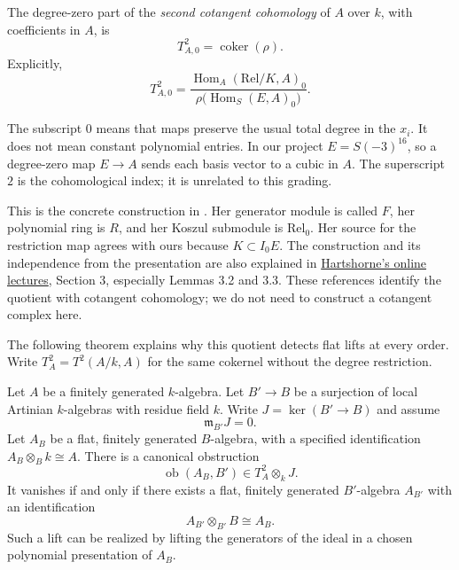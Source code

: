 \begin{definition}
\label{definition-cotangent-two}
The degree-zero part of the
\emph{second cotangent cohomology} of
$A$ over $k$, with coefficients in $A$, is
$$
T^2_{A,0}=\operatorname{coker}(\rho).
$$
Explicitly,
\begin{equation}
\label{equation-cotangent-two-quotient}
T^2_{A,0}=
\frac{
\operatorname{Hom}_A(\mathrm{Rel}/K,A)_0
}{
\rho\bigl(\operatorname{Hom}_S(E,A)_0\bigr)
}.
\end{equation}
\end{definition}

\noindent
The subscript $0$ means that maps preserve
the usual total degree in the $x_i$.
It does not mean constant polynomial
entries. In our project $E=S(-3)^{16}$,
so a degree-zero map $E\to A$ sends each
basis vector to a cubic in $A$.
The superscript $2$ is the cohomological
index; it is unrelated to this grading.

This is the concrete construction in
\cite[Section 0.2]{Fausk}. Her generator
module is called $F$, her polynomial ring
is $R$, and her Koszul submodule is
$\mathrm{Rel}_0$. Her source for the
restriction map agrees with ours because
$K\subset I_0E$.
The construction and its independence
from the presentation are also explained
in \href{https://math.berkeley.edu/%
\string~robin/math274root.pdf}
{Hartshorne's online lectures}, Section 3,
especially Lemmas 3.2 and 3.3.
These references identify the quotient
with cotangent cohomology; we do not need
to construct a cotangent complex here.

The following theorem explains why this
quotient detects flat lifts at every order.
Write $T^2_A=T^2(A/k,A)$ for the same
cokernel without the degree restriction.

\begin{theorem}
\label{theorem-obstruction-flat-lift}
Let $A$ be a finitely generated
$k$-algebra. Let $B'\to B$ be a surjection
of local Artinian $k$-algebras with
residue field $k$. Write $J=\ker(B'\to B)$
and assume
$$
\mathfrak{m}_{B'}J=0.
$$
Let $A_B$ be a flat, finitely generated
$B$-algebra, with a specified
identification $A_B\otimes_B k\cong A$.
There is a canonical obstruction
$$
\operatorname{ob}(A_B,B')
\in T^2_A\otimes_k J.
$$
It vanishes if and only if there exists
a flat, finitely generated $B'$-algebra
$A_{B'}$ with an identification
$$
A_{B'}\otimes_{B'}B\cong A_B.
$$
Such a lift can be realized by lifting
the generators of the ideal in a chosen
polynomial presentation of $A_B$.
\end{theorem}


